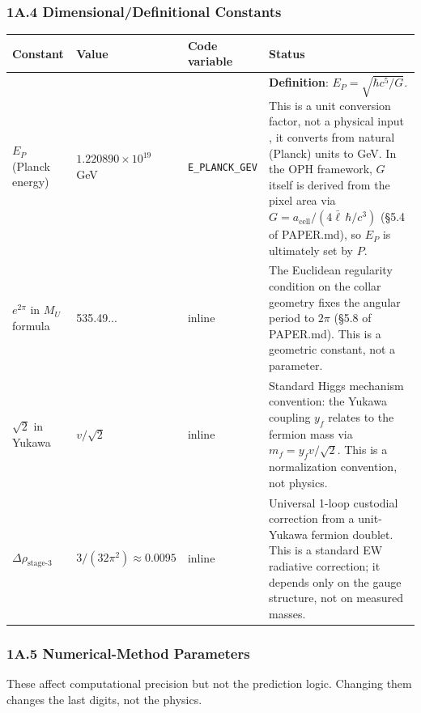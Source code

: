 \subsubsection{1A.4 Dimensional/Definitional Constants}\label{1a4-dimensionaldefinitional-constants}

{\def\LTcaptype{none} %
\begin{longtable}[]{@{}llll@{}}
\toprule\noalign{}
Constant & Value & Code variable & Status \\
\midrule\noalign{}
\endhead
\bottomrule\noalign{}
\endlastfoot
\(E_P\) (Planck energy) & \(1.220890 \times 10^{19}\) GeV & \texttt{E\_PLANCK\_GEV} & \textbf{Definition}: \(E_P = \sqrt{\hbar c^5/G}\). This is a unit conversion factor, not a physical input , it converts from natural (Planck) units to GeV. In the OPH framework, \(G\) itself is derived from the pixel area via \(G = a_{\text{cell}}/(4\bar{\ell}\,\hbar/c^3)\) (§5.4 of PAPER.md), so \(E_P\) is ultimately set by \(P\). \\
\(e^{2\pi}\) in \(M_U\) formula & 535.49... & inline & The Euclidean regularity condition on the collar geometry fixes the angular period to \(2\pi\) (§5.8 of PAPER.md). This is a geometric constant, not a parameter. \\
\(\sqrt{2}\) in Yukawa & \(v/\sqrt{2}\) & inline & Standard Higgs mechanism convention: the Yukawa coupling \(y_f\) relates to the fermion mass via \(m_f = y_f v / \sqrt{2}\). This is a normalization convention, not physics. \\
\(\Delta\rho_{\text{stage-3}}\) & \(3/(32\pi^2) \approx 0.0095\) & inline & Universal 1-loop custodial correction from a unit-Yukawa fermion doublet. This is a standard EW radiative correction; it depends only on the gauge structure, not on measured masses. \\
\end{longtable}
}

\subsubsection{1A.5 Numerical-Method Parameters}\label{1a5-numerical-method-parameters}

These affect computational precision but not the prediction logic. Changing them changes the last digits, not the physics.

